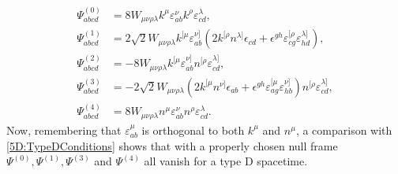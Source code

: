 \begin{equation} 
    \begin{split}
        \Psi^{(0)}_{abcd} &= 8 W_{\mu \nu \rho \lambda} k^{\mu} \varepsilon^{\nu}_{ab} k^{\rho}
        \varepsilon^{\lambda}_{cd}, \\
        \Psi^{(1)}_{abcd} &= 2\sqrt{2} W_{\mu \nu \rho \lambda} k^{[\mu} \varepsilon^{\nu]}_{ab} \left( 2k^{[\rho}
        n^{\lambda]} \epsilon_{cd} + \epsilon^{gh} \varepsilon^{[\rho}_{cg}
    \varepsilon^{\lambda]}_{hd}\right), \\
            \Psi^{(2)}_{abcd} &= -8 W_{\mu \nu \rho \lambda} k^{[\mu} \varepsilon^{\nu]}_{ab} n^{[\rho}
            \varepsilon^{\lambda]}_{cd}, \\
            \Psi^{(3)}_{abcd} &= -2 \sqrt{2}  W_{\mu \nu \rho \lambda} \left( 2k^{[\mu} n^{\nu]} \epsilon_{ab} +
            \epsilon^{gh} \varepsilon^{[\mu}_{ag} \varepsilon^{\nu]}_{hb}\right) n^{[\rho}
            \varepsilon^{\lambda]}_{cd}, \\
                \Psi^{(4)}_{abcd} &= 8 W_{\mu \nu \rho \lambda} n^{\mu} \varepsilon^{\nu}_{ab} n^{\rho}
                \varepsilon^{\lambda}_{cd}.
    \end{split}
\end{equation}
Now, remembering that $\varepsilon^{\mu}_{ab}$ is orthogonal to both $k^{\mu}$ and $n^{\mu}$, a comparison with
\eqref{5D:TypeDConditions} shows that with a properly chosen null frame $\Psi^{(0)}, \Psi^{(1)}, \Psi^{(3)}$ and
$\Psi^{(4)}$ all vanish for a type D spacetime.
